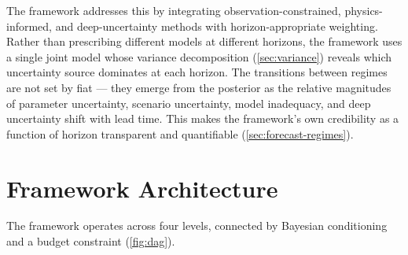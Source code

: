 \documentclass[11pt]{article}
\begin{document}
The framework addresses this by integrating observation-constrained, physics-informed, and deep-uncertainty methods with horizon-appropriate weighting.  Rather than prescribing different models at different horizons, the framework uses a single joint model whose variance decomposition (\cref{sec:variance}) reveals which uncertainty source dominates at each horizon.  The transitions between regimes are not set by fiat --- they emerge from the posterior as the relative magnitudes of parameter uncertainty, scenario uncertainty, model inadequacy, and deep uncertainty shift with lead time.  This makes the framework's own credibility as a function of horizon transparent and quantifiable (\cref{sec:forecast-regimes}).


\section{Framework Architecture}

The framework operates across four levels, connected by Bayesian conditioning and a budget constraint (\cref{fig:dag}).
\end{document}
